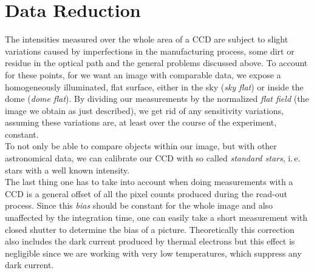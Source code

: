 \section{Data Reduction}

The intensities measured over the whole area of a CCD are subject to slight variations caused by imperfections in the manufacturing process, some dirt or residue in the optical path and the general problems discussed above. To account for these points, for we want an image with comparable data, we expose a homogeneously illuminated, flat surface, either in the sky (\textit{sky flat}) or inside the dome (\textit{dome flat}). By dividing our measurements by the normalized \textit{flat field} (the image we obtain as just described), we get rid of any sensitivity variations, assuming these variations are, at least over the course of the experiment, constant.\\
To not only be able to compare objects within our image, but with other astronomical data, we can calibrate our CCD with so called \textit{standard stars}, i.\,e. stars with a well known intensity. \\
The last thing one has to take into account when doing measurements with a CCD is a general offset of all the pixel counts produced during the read-out process. Since this \textit{bias} should be constant for the whole image and also unaffected by the integration time, one can easily take a short measurement with closed shutter to determine the bias of a picture. Theoretically this correction also includes the dark current produced by thermal electrons but this effect is negligible since we are working with very low temperatures, which suppress any dark current.


